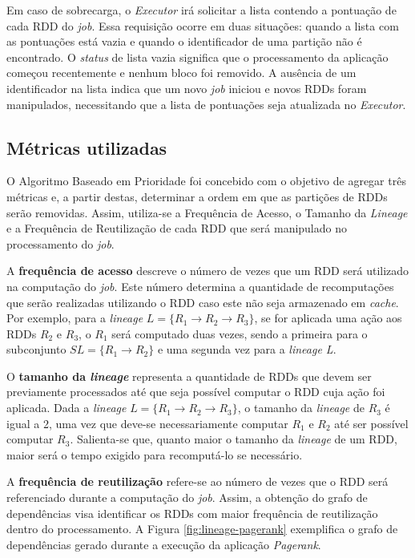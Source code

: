 Em caso de sobrecarga, o \textit{Executor} irá solicitar a lista contendo a pontuação de cada RDD do \textit{job}. Essa requisição ocorre em duas situações: quando a lista com as pontuações está vazia e quando o identificador de uma partição não é encontrado. O \textit{status} de lista vazia significa que o processamento da aplicação começou recentemente e nenhum bloco foi removido. A ausência de um identificador na lista indica que um novo \textit{job} iniciou e novos RDDs foram manipulados, necessitando que a lista de pontuações seja atualizada no \textit{Executor}.  

\subsection{Métricas utilizadas}
O Algoritmo Baseado em Prioridade foi concebido com o objetivo de agregar três métricas e, a partir destas, determinar a ordem em que as partições de RDDs serão removidas. Assim, utiliza-se a Frequência de Acesso, o Tamanho da \textit{Lineage} e a Frequência de Reutilização de cada RDD que será manipulado no processamento do \textit{job}.

A \textbf{frequência de acesso} descreve o número de vezes que um RDD será utilizado na computação do \textit{job}. Este número determina a quantidade de recomputações que serão realizadas utilizando o RDD caso este não seja armazenado em \textit{cache}. Por exemplo, para a \textit{lineage} $L = \{ R_1 \rightarrow R_2 \rightarrow R_3 \}$, se for aplicada uma ação aos RDDs $R_2$ e $R_3$, o $R_1$ será computado duas vezes, sendo a primeira para o subconjunto $SL = \{ R_1 \rightarrow R_2 \}$ e uma segunda vez para a \textit{lineage L}. 

O \textbf{tamanho da \textit{lineage}} representa a quantidade de RDDs que devem ser previamente processados até que seja possível computar o RDD cuja ação foi aplicada. Dada a \textit{lineage} $L = \{ R_1 \rightarrow R_2  \rightarrow R_3 \}$, o tamanho da \textit{lineage} de $R_3$ é igual a 2, uma vez que deve-se necessariamente computar $R_1$ e $R_2$ até ser possível computar $R_3$. Salienta-se que, quanto maior o tamanho da \textit{lineage} de um RDD, maior será o tempo exigido para recomputá-lo se necessário.

A \textbf{frequência de reutilização} refere-se ao número de vezes que o RDD será referenciado durante a computação do \textit{job}. Assim, a obtenção do grafo de dependências visa identificar os RDDs com maior frequência de reutilização dentro do processamento. A Figura \ref{fig:lineage-pagerank} exemplifica o grafo de dependências gerado durante a execução da aplicação \textit{Pagerank}.

